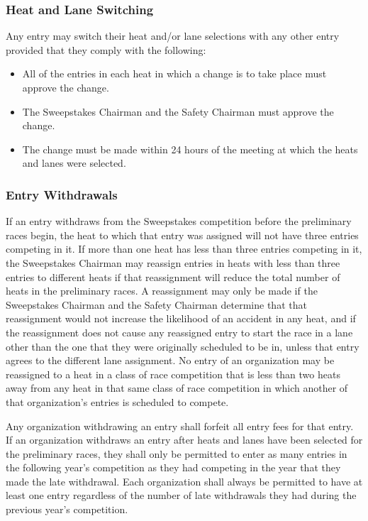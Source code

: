 \subsubsection{Heat and Lane Switching}

	Any entry may switch their heat and/or lane selections with any other entry provided that they comply with the following:
	
	\begin{itemize}
		\item All of the entries in each heat in which a change is to take place must approve the change.
		\item The Sweepstakes Chairman and the Safety Chairman must approve the change.
		\item The change must be made within 24 hours of the meeting at which the heats and lanes were selected.
	\end{itemize}

\subsubsection{Entry Withdrawals}
	
	If an entry withdraws from the Sweepstakes competition before the preliminary
	races begin, the heat to which that entry was assigned will not have three
	entries competing in it. If more than one heat has less than three entries
	competing in it, the Sweepstakes Chairman may reassign entries in heats with
	less than three entries to different heats if that reassignment will reduce the
	total number of heats in the preliminary races. A reassignment may only be made
	if the Sweepstakes Chairman and the Safety Chairman determine that that
	reassignment would not increase the likelihood of an accident in any heat, and
	if the reassignment does not cause any reassigned entry to start the race in a
	lane other than the one that they were originally scheduled to be in, unless
	that entry agrees to the different lane assignment. No entry of an organization
	may be reassigned to a heat in a class of race competition that is less than
	two heats away from any heat in that same class of race competition in which
	another of that organization's entries is scheduled to compete.

	Any organization withdrawing an entry shall forfeit all entry fees for that
	entry. If an organization withdraws an entry after heats and lanes have been
	selected for the preliminary races, they shall only be permitted to enter as
	many entries in the following year's competition as they had competing in the
	year that they made the late withdrawal. Each organization shall always be
	permitted to have at least one entry regardless of the number of late
	withdrawals they had during the previous year's competition.


